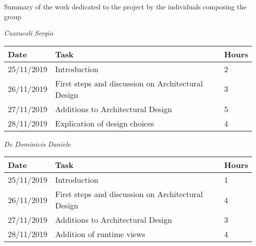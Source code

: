 Summary of the work dedicated to the project by the individuals composing the group

\vspace{1cm}

\textit{Cuzzucoli Sergio}

\hfill

\begin{tabular}{|l|l|l|}

\hline

\textbf{Date} & \textbf{Task} & \textbf{Hours} \\ \hline
25/11/2019 & Introduction &  2 \\ \hline
26/11/2019 & First steps and discussion on Architectural Design & 3 \\ \hline
27/11/2019 & Additions to Architectural Design & 5 \\ \hline
28/11/2019 & Explication of design choices & 4 \\ \hline

\end{tabular}

\vspace{1cm}

\textit{De Dominicis Daniele}

\hfill

\begin{tabular}{|l|l|l|}

\hline

\textbf{Date} & \textbf{Task} & \textbf{Hours} \\ \hline
25/11/2019 & Introduction &  1 \\ \hline
26/11/2019 & First steps and discussion on Architectural Design & 4 \\ \hline
27/11/2019 & Additions to Architectural Design & 3 \\ \hline
28/11/2019 & Addition of runtime views & 4 \\ \hline

\end{tabular}